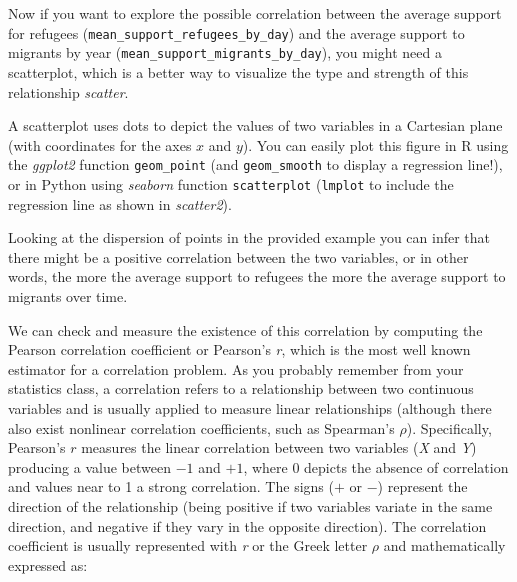 Now if you want to explore the possible correlation between the average support for refugees (\texttt{mean\_support\_refugees\_by\_day}) and the average support to migrants by year (\texttt{mean\_support\_migrants\_by\_day}), you might need a scatterplot, which is a better way to visualize the type and strength of this relationship \emph{scatter}.


A scatterplot uses dots to depict the values of two variables in a Cartesian plane (with coordinates for the axes $x$ and $y$). You can easily plot this figure in R using the \emph{ggplot2} function \texttt{geom\_point} (and \texttt{geom\_smooth} to display a regression line!), or in Python using \emph{seaborn} function \texttt{scatterplot} (\texttt{lmplot} to include the regression line as shown in \emph{scatter2}).


Looking at the dispersion of points in the provided example you can infer that there might be a positive correlation between the two variables, or in other words, the more the average support to refugees the more the average support to migrants over time.

We can check and measure the existence of this correlation by computing the Pearson correlation coefficient or Pearson's \emph{r}, which is the most well known estimator for a correlation problem. As you probably remember from your statistics class, a correlation refers to a relationship between two continuous variables and is usually applied to measure linear relationships (although there  also exist nonlinear correlation coefficients, such as Spearman's $\rho$). Specifically, Pearson's $r$  measures the linear correlation between two variables (\emph{X} and \emph{Y}) producing a value between $-1$ and $+1$, where 0 depicts the absence of correlation and values near to 1 a strong correlation. The signs ($+$ or $-$) represent the direction of the relationship (being positive if two variables variate in the same direction, and negative if they vary in the opposite direction). The correlation coefficient is usually represented with \emph{r} or the Greek letter $\rho$ and mathematically expressed as:

